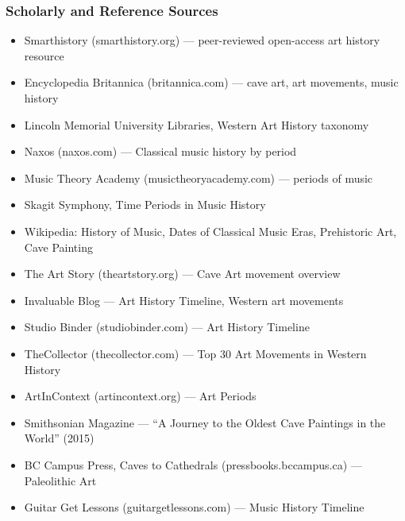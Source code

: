 \documentclass[11pt,letterpaper]{article}
\begin{document}
\subsubsection*{Scholarly and Reference Sources}
\begin{itemize}[noitemsep]
  \item Smarthistory (smarthistory.org) --- peer-reviewed open-access art history resource
  \item Encyclopedia Britannica (britannica.com) --- cave art, art movements, music history
  \item Lincoln Memorial University Libraries, Western Art History taxonomy
  \item Naxos (naxos.com) --- Classical music history by period
  \item Music Theory Academy (musictheoryacademy.com) --- periods of music
  \item Skagit Symphony, Time Periods in Music History
  \item Wikipedia: History of Music, Dates of Classical Music Eras, Prehistoric Art, Cave Painting
  \item The Art Story (theartstory.org) --- Cave Art movement overview
  \item Invaluable Blog --- Art History Timeline, Western art movements
  \item Studio Binder (studiobinder.com) --- Art History Timeline
  \item TheCollector (thecollector.com) --- Top 30 Art Movements in Western History
  \item ArtInContext (artincontext.org) --- Art Periods
  \item Smithsonian Magazine --- ``A Journey to the Oldest Cave Paintings in the World'' (2015)
  \item BC Campus Press, Caves to Cathedrals (pressbooks.bccampus.ca) --- Paleolithic Art
  \item Guitar Get Lessons (guitargetlessons.com) --- Music History Timeline
\end{itemize}
\end{document}
